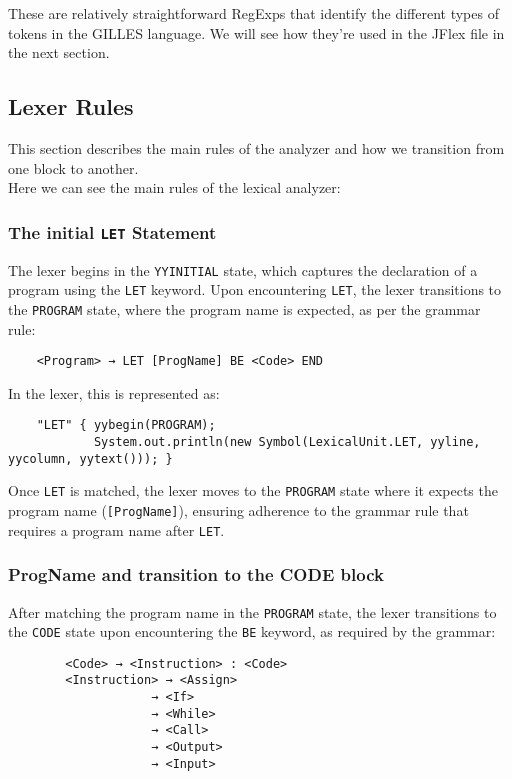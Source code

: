 \documentclass{article}
\begin{document}
	These are relatively straightforward RegExps that identify the different types of tokens in the GILLES language. We will see how they're used in the JFlex file in the next section.\\

	\subsection{Lexer Rules}
	This section describes the main rules of the analyzer and how we transition from one block to another.\\

	Here we can see the main rules of the lexical analyzer:

	\subsubsection{The initial \texttt{LET} Statement}
	The lexer begins in the \texttt{YYINITIAL} state, which captures the declaration of a program using the \texttt{LET} keyword. Upon encountering \texttt{LET}, the lexer transitions to the \texttt{PROGRAM} state, where the program name is expected, as per the grammar rule:

	\begin{verbatim}
	<Program> → LET [ProgName] BE <Code> END
	\end{verbatim}

	In the lexer, this is represented as:

	\begin{verbatim}
	"LET" { yybegin(PROGRAM);
			System.out.println(new Symbol(LexicalUnit.LET, yyline, yycolumn, yytext())); }
	\end{verbatim}

	Once \texttt{LET} is matched, the lexer moves to the \texttt{PROGRAM} state where it expects the program name (\texttt{[ProgName]}), ensuring adherence to the grammar rule that requires a program name after \texttt{LET}.

	\subsubsection{ProgName and transition to the CODE block}
	After matching the program name in the \texttt{PROGRAM} state, the lexer transitions to the \texttt{CODE} state upon encountering the \texttt{BE} keyword, as required by the grammar:

	\begin{verbatim}
		<Code> → <Instruction> : <Code>
		<Instruction> → <Assign>
					→ <If>
					→ <While>
					→ <Call>
					→ <Output>
					→ <Input>
	\end{verbatim}
\end{document}
